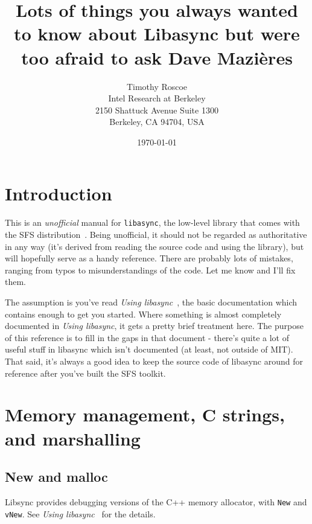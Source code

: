 \documentclass[11pt]{article}
\begin{document}
\title{Lots of things you always wanted to know about Libasync but
  were too afraid to ask Dave Mazi{\`e}res}
\author{Timothy Roscoe\\
Intel Research at Berkeley\\
2150 Shattuck Avenue Suite 1300\\
Berkeley, CA 94704, USA
}
\date{\today}
\maketitle

\section{Introduction}

This is an \emph{unofficial} manual for \texttt{libasync}, the
low-level library that comes with the SFS distribution~\cite{sfs}.
Being unofficial, it should not be regarded as authoritative in any
way (it's derived from reading the source code and using the library),
but will hopefully serve as a handy reference.  There are probably
lots of mistakes, ranging from typos to misunderstandings of the
code.  Let me know and I'll fix them. 

The assumption is you've read \emph{Using
libasync}~\cite{using_libasync}, the basic documentation which 
contains enough to get you started.  Where something is almost
completely documented in \emph{Using libasync}, it gets a pretty brief
treatment here.  The purpose of this reference is
to fill in the gaps in that document - there's quite a lot of useful
stuff in libasync which isn't documented (at least, not outside of
MIT).  That said, it's always a good idea to keep the source code of
libasync around for reference after you've built the SFS toolkit. 

\section{Memory management, C strings, and marshalling}

\subsection{New and malloc}

Libsync provides debugging versions of the C++ memory allocator, with
\texttt{New} and \texttt{vNew}.  See \textit{Using
  libasync}~\cite{using_libasync} for the details.
\end{document}
